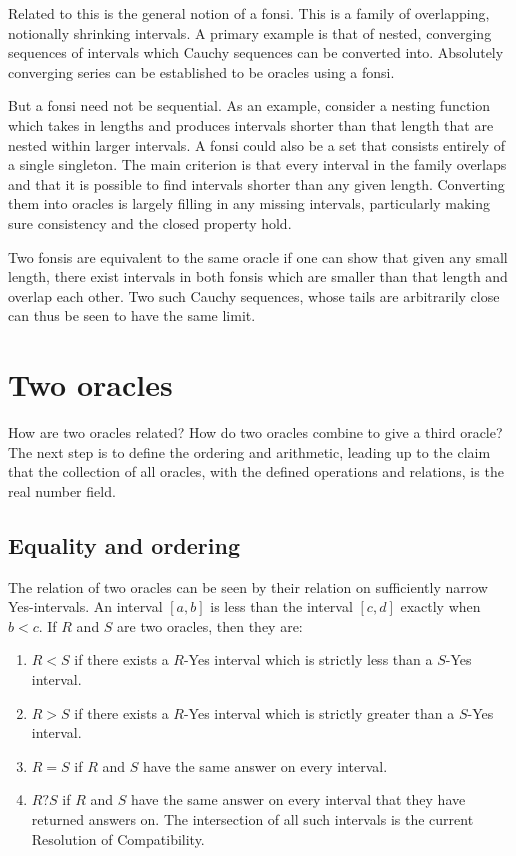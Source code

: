\documentclass[12pt]{article}
\theoremstyle{remark}
\begin{document}
Related to this is the general notion of a fonsi. This is a family of overlapping, notionally shrinking intervals. A primary example is that of nested, converging sequences of intervals which Cauchy sequences can be converted into. Absolutely converging series can be established to be oracles using a fonsi. 

But a fonsi need not be sequential. As an example, consider a nesting function which takes in lengths and produces intervals shorter than that length that are nested within larger intervals. A fonsi could also be a set that consists entirely of a single singleton. The main criterion is that every interval in the family overlaps and that it is possible to find intervals shorter than any given length. Converting them into oracles is largely filling in any missing intervals, particularly making sure consistency and the closed property hold.  

Two fonsis are equivalent to the same oracle if one can show that given any small length, there exist intervals in both fonsis which are smaller than that length and overlap each other. Two such Cauchy sequences, whose tails are arbitrarily close can thus be seen to have the same limit. 

\section{Two oracles}

How are two oracles related? How do two oracles combine to give a third oracle?  The next step is to define the ordering and arithmetic, leading up to the claim that the collection of all oracles, with the defined operations and relations, is the real number field. 

\subsection{Equality and ordering}

The relation of two oracles can be seen by their relation on sufficiently narrow Yes-intervals. An interval $[a,b]$ is less than the interval $[c,d]$ exactly when $b < c$. If $R$ and $S$ are two oracles, then they are:
\begin{enumerate}
\item $R<S$ if there exists a $R$-Yes interval which is strictly less than a $S$-Yes interval.
\item $R>S$ if there exists a $R$-Yes interval which is strictly greater than a $S$-Yes interval.
\item $R=S$ if $R$ and $S$ have the same answer on every interval.
\item $R?S$ if $R$ and $S$ have the same answer on every interval that they have returned answers on. The intersection of all such intervals is the current Resolution of Compatibility. 
\end{enumerate}
\end{document}
